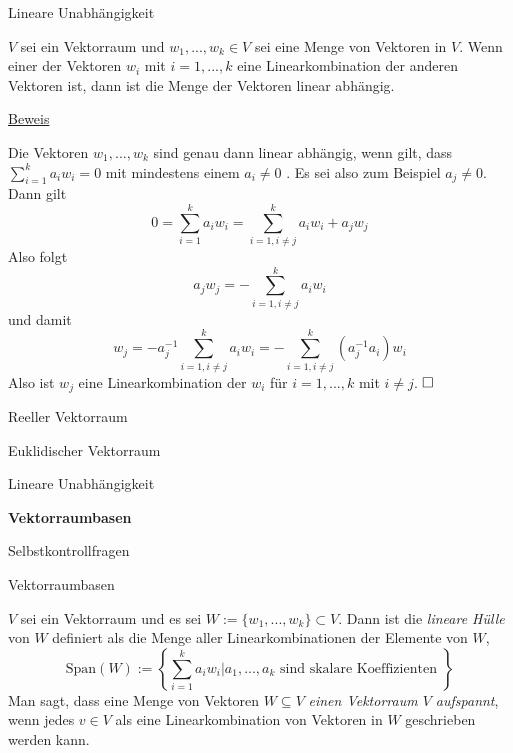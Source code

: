 \documentclass[
  8pt,
  ignorenonframetext,
]{beamer}
\begin{document}
\begin{frame}{Lineare Unabhängigkeit}
\protect\hypertarget{lineare-unabhuxe4ngigkeit-3}{}
\small
\begin{theorem}
\justifying
\normalfont
$V$ sei ein Vektorraum und $w_1,...,w_k \in V$ sei eine Menge von Vektoren in $V$.
Wenn einer der Vektoren $w_i$ mit $i = 1,...,k$ eine Linearkombination der anderen
Vektoren ist, dann ist die Menge der Vektoren linear abhängig.
\end{theorem}

\footnotesize

\underline{Beweis}

Die Vektoren \(w_1,...,w_k\) sind genau dann linear abhängig, wenn gilt,
dass \(\sum_{i=1}^k a_i w_i = 0\) mit mindestens einem \(a_i \neq 0\) .
Es sei also zum Beispiel \(a_j \neq 0\). Dann gilt \begin{equation}
0 = \sum_{i=1}^k a_i w_i = \sum_{i=1, i \neq j}^k a_i w_i + a_jw_j
\end{equation} Also folgt \begin{equation}
a_jw_j  = - \sum_{i=1, i \neq j}^k a_i w_i
\end{equation} und damit \begin{equation}
w_j  = - a_j^{-1}\sum_{i=1, i \neq j}^k a_i w_i = - \sum_{i=1, i \neq j}^k (a_j^{-1}a_i) w_i
\end{equation} Also ist \(w_j\) eine Linearkombination der \(w_i\) für
\(i = 1,...,k\) mit \(i \neq j\). \(\hfill \Box\)
\end{frame}

\begin{frame}{}
\protect\hypertarget{section-7}{}
\large
\vfill

Reeller Vektorraum

Euklidischer Vektorraum

Lineare Unabhängigkeit

\textbf{Vektorraumbasen}

Selbstkontrollfragen \vfill
\end{frame}

\begin{frame}{Vektorraumbasen}
\protect\hypertarget{vektorraumbasen}{}
\small
\begin{definition}
\justifying
$V$ sei ein Vektorraum und es sei $W := \{w_1,...,w_k\} \subset V$. Dann ist die
\textit{lineare Hülle} von $W$ definiert als die Menge aller Linearkombinationen
der Elemente von $W$,
\begin{equation}
\mbox{Span}(W) := \left\lbrace \sum_{i=1}^k a_iw_i \vert a_1,...,a_k \mbox{ sind skalare Koeffizienten } \right\rbrace
\end{equation}
Man sagt, dass eine Menge von Vektoren $W \subseteq V$ \textit{einen Vektorraum $V$ aufspannt},
wenn jedes $v \in V$ als eine Linearkombination von Vektoren in $W$ geschrieben werden kann.
\end{definition}
\end{frame}
\end{document}
